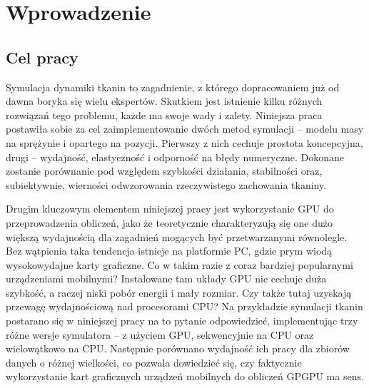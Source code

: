 \chapter{Wprowadzenie}
\label{t:wprowadzenie}

	
		
	\section{Cel pracy}
	\label{t:wprowadzenie:cel}
	
	Symulacja dynamiki tkanin to zagadnienie, z którego dopracowaniem już od dawna boryka się wielu ekspertów. Skutkiem jest istnienie kilku różnych rozwiązań tego problemu, każde ma swoje wady i zalety. Niniejsza praca postawiła sobie za cel zaimplementowanie dwóch metod symulacji -- modelu masy na sprężynie i opartego na pozycji. Pierwszy z nich cechuje prostota koncepcyjna, drugi -- wydajność, elastyczność i odporność na błędy numeryczne. Dokonane zostanie porównanie pod względem szybkości działania, stabilności oraz, subiektywnie, wierności odwzorowania rzeczywistego zachowania tkaniny.
	
	Drugim kluczowym elementem niniejszej pracy jest wykorzystanie GPU do przeprowadzenia obliczeń, jako że teoretycznie charakteryzują się one dużo większą wydajnością dla zagadnień mogących być przetwarzanymi równolegle. Bez wątpienia taka tendencja istnieje na platformie PC, gdzie prym wiodą wysokowydajne karty graficzne. Co w takim razie z coraz bardziej popularnymi urządzeniami mobilnymi? Instalowane tam układy GPU nie cechuje duża szybkość, a raczej niski pobór energii i mały rozmiar. Czy także tutaj uzyskają przewagę wydajnościową nad procesorami CPU? Na przykładzie symulacji tkanin postarano się w niniejszej pracy na to pytanie odpowiedzieć, implementując trzy różne wersje symulatora -- z użyciem GPU, sekwencyjnie na CPU oraz wielowątkowo na CPU. Następnie porównano wydajność ich pracy dla zbiorów danych o różnej wielkości, co pozwala dowiedzieć się, czy faktycznie wykorzystanie kart graficznych urządzeń mobilnych do obliczeń GPGPU ma sens.
	
